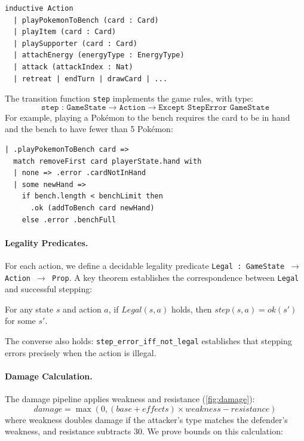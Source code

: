 \documentclass[a4paper,UKenglish,cleveref,autoref,anonymous]{lipics-v2021}
\begin{document}
\begin{lstlisting}[basicstyle=\ttfamily\small,columns=flexible]
inductive Action
  | playPokemonToBench (card : Card)
  | playItem (card : Card)
  | playSupporter (card : Card)
  | attachEnergy (energyType : EnergyType)
  | attack (attackIndex : Nat)
  | retreat | endTurn | drawCard | ...
\end{lstlisting}

The transition function \texttt{step} implements the game rules, with type:
\[
\texttt{step : GameState} \to \texttt{Action} \to \texttt{Except StepError GameState}
\]
For example, playing a Pok\'emon to the bench requires the card to be in hand and the bench to have fewer than 5 Pok\'emon:

\begin{lstlisting}[basicstyle=\ttfamily\small,columns=flexible]
| .playPokemonToBench card =>
  match removeFirst card playerState.hand with
  | none => .error .cardNotInHand
  | some newHand =>
    if bench.length < benchLimit then
      .ok (addToBench card newHand)
    else .error .benchFull
\end{lstlisting}

\paragraph{Legality Predicates.}
For each action, we define a decidable legality predicate \texttt{Legal : GameState $\to$ Action $\to$ Prop}.
A key theorem establishes the correspondence between \texttt{Legal} and successful stepping:

\begin{theorem}
For any state $s$ and action $a$, if $\mathit{Legal}(s, a)$ holds, then $\mathit{step}(s, a) = \mathit{ok}(s')$ for some $s'$.
\end{theorem}

The converse also holds: \texttt{step\_error\_iff\_not\_legal} establishes that stepping errors precisely when the action is illegal.

\paragraph{Damage Calculation.}
The damage pipeline applies weakness and resistance (\cref{fig:damage}):
$$\mathit{damage} = \max(0, (\mathit{base} + \mathit{effects}) \times \mathit{weakness} - \mathit{resistance})$$
where weakness doubles damage if the attacker's type matches the defender's weakness, and resistance subtracts 30.
We prove bounds on this calculation:
\end{document}
